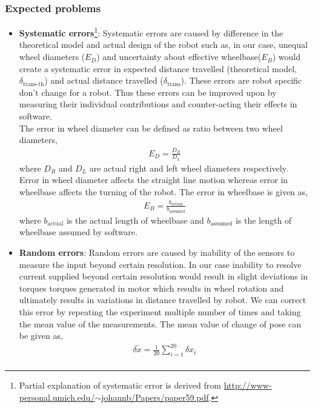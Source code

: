 \subsubsection*{Expected problems}
\begin{itemize}
\item \textbf{Systematic errors}\footnote{Partial explanation of systematic error is derived from \href{http://www-personal.umich.edu/~johannb/Papers/paper59.pdf}{http://www-personal.umich.edu/$\sim$johannb/Papers/paper59.pdf}.}: Systematic errors are caused by difference in the theoretical model and actual design of the robot such as, in our case, unequal wheel diameters ($E_D$) and uncertainty about effective wheelbase($E_B$) would create a systematic error in expected distance travelled (theoretical model, $\delta_{\text{trans-th}}$) and actual distance travelled ($\delta_{\text{trans}}$). These errors are robot specific don't change for a robot. Thus these errors can be improved upon by measuring their individual contributions and counter-acting their effects in software.\\
The error in wheel diameter can be defined as ratio between two wheel diameters,
\begin{align*}
E_D = \frac{D_R}{D_L}
\end{align*}
where $D_R$ and $D_L$ are actual right and left wheel diameters respectively. Error in wheel diameter affects the straight line motion whereas error in wheelbase affects the turning of the robot. The error in wheelbase is given as,
\begin{align*}
E_B = \frac{b_{\text{actual}}}{b_{\text{assumed}}}
\end{align*}
where $b_{\text{actual}}$ is the actual length of wheelbase and $b_{\text{assumed}}$ is the length of wheelbase assumed by software.
\item \textbf{Random errors}: Random errors are caused by inability of the sensors to measure the input beyond certain resolution. In our case inability to resolve current supplied beyond certain resolution would result in slight deviations in torques torques generated in motor which results in wheel rotation and ultimately results in variations in distance travelled by robot. We can correct this error by repeating the experiment multiple number of times and taking the mean value of the measurements. The mean value of change of pose can be given as,
\begin{align*}
\overline{\delta x} = \frac{1}{20} \sum_{i=1}^{20} \delta x_i \\

\end{align*}
\end{itemize}
